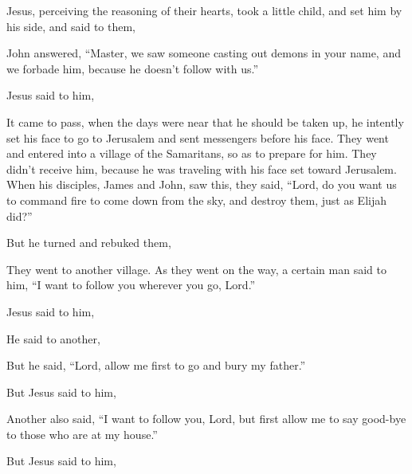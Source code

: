 {Jesus, perceiving the reasoning of their hearts, took a little child, and set him by his side,
and said to them,
{}
\par }{\PP {}John answered, “Master, we saw someone casting out demons in your name, and we forbade him, because he doesn’t follow with us.”
\par }{\PP {}Jesus said to him,
{}
\par }{\PP {}It came to pass, when the days were near that he should be taken up, he intently set his face to go to Jerusalem
and sent messengers before his face. They went and entered into a village of the Samaritans, so as to prepare for him.
They didn’t receive him, because he was traveling with his face set toward Jerusalem.
When his disciples, James and John, saw this, they said, “Lord, do you want us to command fire to come down from the sky, and destroy them, just as Elijah did?”
\par }{\PP {}But he turned and rebuked them,
{}
\par }{\PP They went to another village.
As they went on the way, a certain man said to him, “I want to follow you wherever you go, Lord.”
\par }{\PP {}Jesus said to him,
{}
\par }{\PP {}He said to another,
{}
\par }{\PP But he said, “Lord, allow me first to go and bury my father.”
\par }{\PP {}But Jesus said to him,
{}
\par }{\PP {}Another also said, “I want to follow you, Lord, but first allow me to say good-bye to those who are at my house.”
\par }{\PP {}But Jesus said to him,
{}

}

